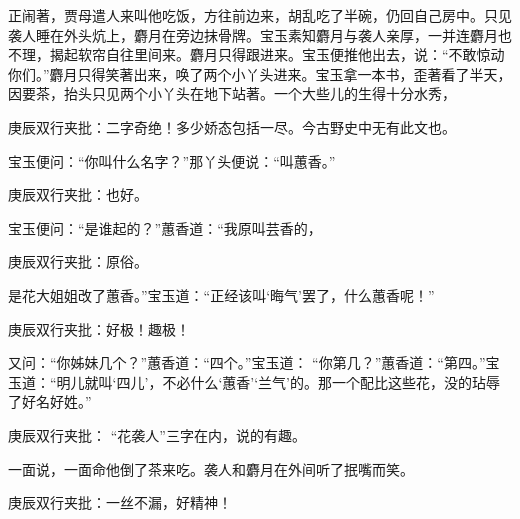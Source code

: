 \begin{parag}


    正闹著，贾母遣人来叫他吃饭，方往前边来，胡乱吃了半碗，仍回自己房中。只见袭人睡在外头炕上，麝月在旁边抹骨牌。宝玉素知麝月与袭人亲厚，一并连麝月也不理，揭起软帘自往里间来。麝月只得跟进来。宝玉便推他出去，说：“不敢惊动你们。”麝月只得笑著出来，唤了两个小丫头进来。宝玉拿一本书，歪著看了半天，因要茶，抬头只见两个小丫头在地下站著。一个大些儿的生得十分水秀，\begin{note}庚辰双行夹批：二字奇绝！多少娇态包括一尽。今古野史中无有此文也。\end{note}宝玉便问：“你叫什么名字？”那丫头便说：“叫蕙香。”\begin{note}庚辰双行夹批：也好。\end{note}宝玉便问：“是谁起的？”蕙香道：“我原叫芸香的，\begin{note}庚辰双行夹批：原俗。\end{note}是花大姐姐改了蕙香。”宝玉道：“正经该叫‘晦气’罢了，什么蕙香呢！”\begin{note}庚辰双行夹批：好极！趣极！\end{note}又问：“你姊妹几个？”蕙香道：“四个。”宝玉道： “你第几？”蕙香道：“第四。”宝玉道：“明儿就叫‘四儿’，不必什么‘蕙香’‘兰气’的。那一个配比这些花，没的玷辱了好名好姓。”\begin{note}庚辰双行夹批： “花袭人”三字在内，说的有趣。\end{note}一面说，一面命他倒了茶来吃。袭人和麝月在外间听了抿嘴而笑。\begin{note}庚辰双行夹批：一丝不漏，好精神！\end{note}
\end{parag}


